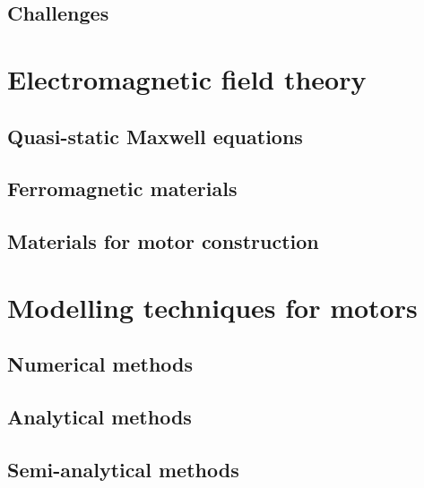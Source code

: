 \subsection{Challenges}                         \label{Chapter:background/linear synchronous motors for NFJI/challenges}


\section{Electromagnetic field theory}          \label{Chapter:background/electromagnetic field theory}
\subsection{Quasi-static Maxwell equations}     \label{Chapter:background/electromagnetic field theory/quasi-static maxwell equations}
\subsection{Ferromagnetic materials}            \label{Chapter:background/electromagnetic field theory/ferromagnetic materials}
\subsection{Materials for motor construction}   \label{Chapter:background/electromagnetic field theory/materials for motor construction}


\section{Modelling techniques for motors}       \label{Chapter:background/modelling techniques for designing motors}
\subsection{Numerical methods}                  \label{Chapter:background/modelling techniques for designing motors/numerical methods}
\subsection{Analytical methods}                 \label{Chapter:background/modelling techniques for designing motors/analytical methods}
\subsection{Semi-analytical methods}            \label{Chapter:background/modelling techniques for designing motors/semi-analytical methods}
